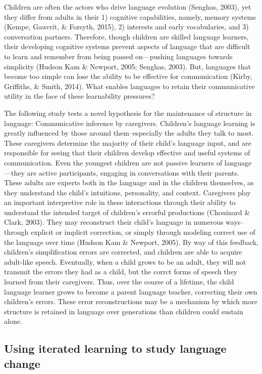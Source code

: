 \documentclass[10pt, letterpaper]{article}
\begin{document}
Children are often the actors who drive language evolution (Senghas,
2003), yet they differ from adults in their 1) cognitive capabilities,
namely, memory systems (Kempe, Gauvrit, \& Forsyth, 2015), 2) interests
and early vocabularies, and 3) conversation partners. Therefore, though
children are skilled language learners, their developing cognitive
systems prevent aspects of language that are difficult to learn and
remember from being passed on---pushing languages towards simplicity
(Hudson Kam \& Newport, 2005; Senghas, 2003). But, languages that become
too simple can lose the ability to be effective for communication
(Kirby, Griffiths, \& Smith, 2014). What enables languages to retain
their communicative utility in the face of these learnability pressures?

The following study tests a novel hypothesis for the maintenance of
structure in language: Communicative inference by caregivers. Children's
language learning is greatly influenced by those around them--especially
the adults they talk to most. These caregivers determine the majority of
their child's language input, and are responsible for seeing that their
children develop effective and useful systems of communication. Even the
youngest children are not passive learners of language---they are active
participants, engaging in conversations with their parents. These adults
are experts both in the language and in the children themselves, as they
understand the child's intuitions, personality, and context. Caregivers
play an important interpretive role in these interactions through their
ability to understand the intended target of children's errorful
productions (Chouinard \& Clark, 2003). They may reconstruct their
child's language in numerous ways-- through explicit or implicit
correction, or simply through modeling correct use of the language over
time (Hudson Kam \& Newport, 2005). By way of this feedback, children's
simplification errors are corrected, and children are able to acquire
adult-like speech. Eventually, when a child grows to be an adult, they
will not transmit the errors they had as a child, but the corrct forms
of speech they learned from their caregivers. Thus, over the course of a
lifetime, the child language learner grows to become a parent language
teacher, correcting their own children's errors. These error
reconstructions may be a mechanism by which more structure is retained
in language over generations than children could sustain alone.

\hypertarget{using-iterated-learning-to-study-language-change}{%
\subsection{Using iterated learning to study language
change}\label{using-iterated-learning-to-study-language-change}}
\end{document}
